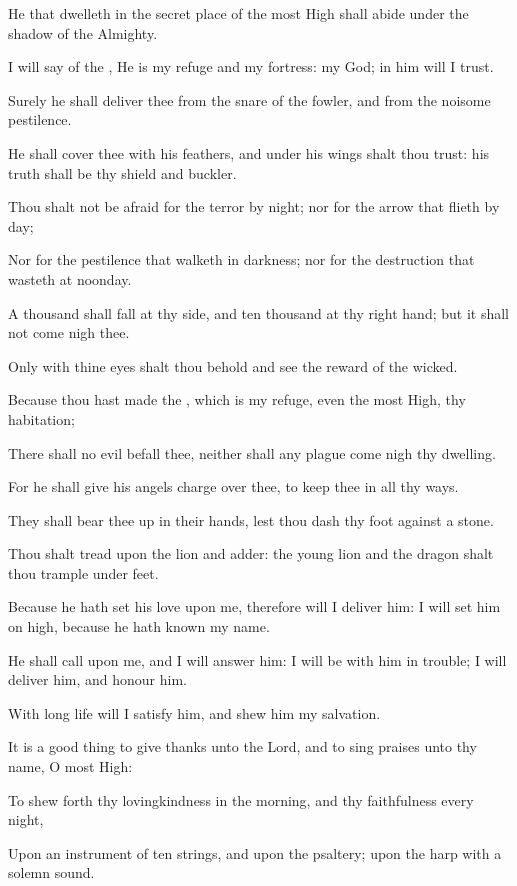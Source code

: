 \Chapter
\Verse He that dwelleth in the secret place of the most High shall abide under the shadow of the Almighty.

\Verse I will say of the \LORD, He is my refuge and my fortress: my God; in him will I trust.

\Verse Surely he shall deliver thee from the snare of the fowler, and from the noisome pestilence.

\Verse He shall cover thee with his feathers, and under his wings shalt thou trust: his truth shall be thy shield and buckler.

\Verse Thou shalt not be afraid for the terror by night; nor for the arrow that flieth by day;

\Verse Nor for the pestilence that walketh in darkness; nor for the destruction that wasteth at noonday.

\Verse A thousand shall fall at thy side, and ten thousand at thy right hand; but it shall not come nigh thee.

\Verse Only with thine eyes shalt thou behold and see the reward of the wicked.

\Verse Because thou hast made the \LORD, which is my refuge, even the most High, thy habitation;

\Verse There shall no evil befall thee, neither shall any plague come nigh thy dwelling.

\Verse For he shall give his angels charge over thee, to keep thee in all thy ways.

\Verse They shall bear thee up in their hands, lest thou dash thy foot against a stone.

\Verse Thou shalt tread upon the lion and adder: the young lion and the dragon shalt thou trample under feet.

\Verse Because he hath set his love upon me, therefore will I deliver him: I will set him on high, because he hath known my name.

\Verse He shall call upon me, and I will answer him: I will be with him in trouble; I will deliver him, and honour him.

\Verse With long life will I satisfy him, and shew him my salvation.




\Chapter
\Verse It is a good thing to give thanks unto the Lord, and to sing praises unto thy name, O most High:

\Verse To shew forth thy lovingkindness in the morning, and thy faithfulness every night,

\Verse Upon an instrument of ten strings, and upon the psaltery; upon the harp with a solemn sound.

